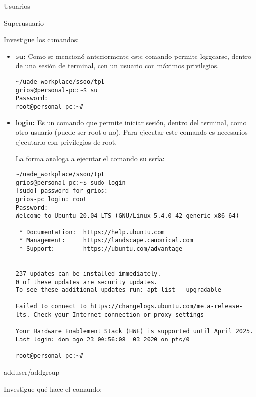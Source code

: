 \begin{section}{Usuarios}
\begin{subsection}{Superusuario}
\begin{itemize}
\end{itemize}


\begin{quoting}
Investigue los comandos:
\end{quoting}


\begin{itemize}
\item \textbf{su:}
Como se mencionó anteriormente este comando permite loggearse, dentro de una sesión de terminal, con un usuario con máximos privilegios.

\begin{lstlisting}[style=Ubuntu]
~/uade_workplace/ssoo/tp1
grios@personal-pc:~$ su
Password: 
root@personal-pc:~#
\end{lstlisting}

\item \textbf{login:}
Es un comando que permite iniciar sesión, dentro del terminal, como otro usuario (puede ser root o no). Para ejecutar este comando es necesarios ejecutarlo con privilegios de root.

La forma analoga a ejecutar el comando su sería:
\begin{lstlisting}[style=Ubuntu]
~/uade_workplace/ssoo/tp1
grios@personal-pc:~$ sudo login
[sudo] password for grios: 
grios-pc login: root
Password: 
Welcome to Ubuntu 20.04 LTS (GNU/Linux 5.4.0-42-generic x86_64)

 * Documentation:  https://help.ubuntu.com
 * Management:     https://landscape.canonical.com
 * Support:        https://ubuntu.com/advantage


237 updates can be installed immediately.
0 of these updates are security updates.
To see these additional updates run: apt list --upgradable

Failed to connect to https://changelogs.ubuntu.com/meta-release-lts. Check your Internet connection or proxy settings

Your Hardware Enablement Stack (HWE) is supported until April 2025.
Last login: dom ago 23 00:56:08 -03 2020 on pts/0

root@personal-pc:~# 
\end{lstlisting}
\end{itemize}
\end{subsection}

\begin{subsection}{adduser/addgroup}

\begin{quoting}
Investigue qué hace el comando:
\end{quoting}


\end{subsection}
\end{section}

